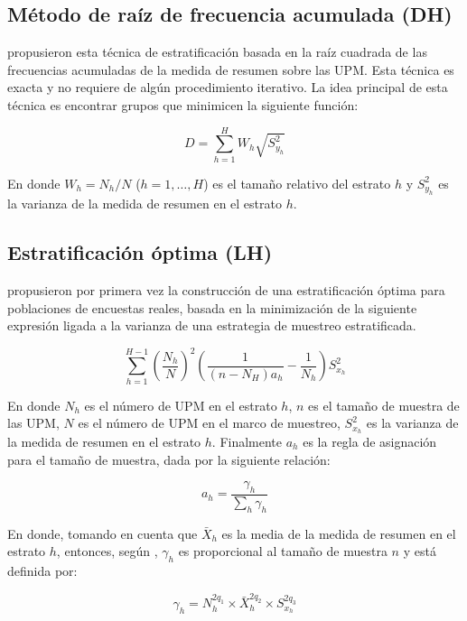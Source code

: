 \documentclass[
  12pt,
]{book}
\begin{document}
\hypertarget{muxe9todo-de-rauxedz-de-frecuencia-acumulada-dh}{%
\subsection{Método de raíz de frecuencia acumulada (DH)}\label{muxe9todo-de-rauxedz-de-frecuencia-acumulada-dh}}

\citet{Dalenius_Hodges_1959} propusieron esta técnica de estratificación basada en la raíz cuadrada de las frecuencias acumuladas de la medida de resumen sobre las UPM. Esta técnica es exacta y no requiere de algún procedimiento iterativo. La idea principal de esta técnica es encontrar grupos que minimicen la siguiente función:

\[
D = \sum_{h=1}^H W_h \sqrt{S^2_{y_{h}}}
\]

En donde \(W_h = N_h/N\) (\(h = 1, \ldots, H\)) es el tamaño relativo del estrato \(h\) y \(S^2_{y_{h}}\) es la varianza de la medida de resumen en el estrato \(h\).

\hypertarget{estratificaciuxf3n-uxf3ptima-lh}{%
\subsection{Estratificación óptima (LH)}\label{estratificaciuxf3n-uxf3ptima-lh}}

\citet{Lavallee_Hidiroglou_1988} propusieron por primera vez la construcción de una estratificación óptima para poblaciones de encuestas reales, basada en la minimización de la siguiente expresión ligada a la varianza de una estrategia de muestreo estratificada.

\[
\sum_{h=1}^{H-1} \left(\frac{N_h}{N}\right)^2\left(\frac{1}{(n-N_H)a_h}-\frac{1}{N_h}\right) S^2_{x_h}
\]

En donde \(N_h\) es el número de UPM en el estrato \(h\), \(n\) es el tamaño de muestra de las UPM, \(N\) es el número de UPM en el marco de muestreo, \(S^2_{x_h}\) es la varianza de la medida de resumen en el estrato \(h\). Finalmente \(a_h\) es la regla de asignación para el tamaño de muestra, dada por la siguiente relación:

\[
a_h = \frac{\gamma_h}{\sum_h \gamma_h}
\]

En donde, tomando en cuenta que \(\bar{X}_h\) es la media de la medida de resumen en el estrato \(h\), entonces, según \citep{Baillargeon_Rivest_2011}, \(\gamma_h\) es proporcional al tamaño de muestra \(n\) y está definida por:

\[
\gamma_h = N_h^{2q_1} \times  \bar{X}_h^{2q_2} \times S^{2q_3}_{x_h}
\]
\end{document}

